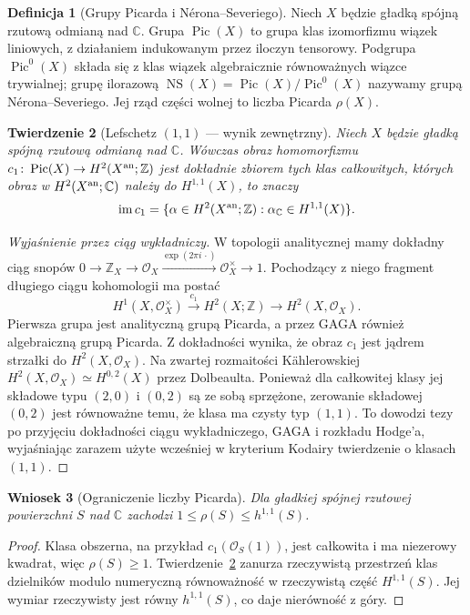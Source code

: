 \documentclass[11pt,a4paper,openany]{report}
\numberwithin{equation}{section}
\theoremstyle{plain}
\newtheorem{twierdzenie}{Twierdzenie}[section]
\newtheorem{wniosek}[twierdzenie]{Wniosek}
\theoremstyle{definition}
\newtheorem{definicja}[twierdzenie]{Definicja}
\theoremstyle{remark}
\newcommand{\Z}{\mathbb Z}
\newcommand{\C}{\mathbb C}
\begin{document}
\begin{definicja}[Grupy Picarda i Nérona--Severiego]
Niech $X$ będzie gładką spójną rzutową odmianą nad $\C$.
Grupa $\operatorname{Pic}(X)$ to grupa klas izomorfizmu
wiązek liniowych, z działaniem indukowanym przez iloczyn tensorowy.
Podgrupa $\operatorname{Pic}^0(X)$ składa się z klas
wiązek algebraicznie równoważnych wiązce trywialnej;
grupę ilorazową
$\operatorname{NS}(X)=\operatorname{Pic}(X)/\operatorname{Pic}^0(X)$
nazywamy grupą Nérona--Severiego.
Jej rząd części wolnej to liczba Picarda $\rho(X)$.
\end{definicja}

\begin{twierdzenie}[Lefschetz $(1,1)$ — wynik zewnętrzny]
\label{tw:ga10-11}
Niech $X$ będzie gładką spójną rzutową odmianą nad $\C$.
Wówczas obraz homomorfizmu
$c_1\colon\operatorname{Pic}(X)\to H^2(X^{\rm an};\Z)$
jest dokładnie zbiorem tych klas całkowitych,
których obraz w $H^2(X^{\rm an};\C)$ należy do
$H^{1,1}(X)$, to znaczy
\[
 \operatorname{im}c_1
 =\{\alpha\in H^2(X^{\rm an};\Z):
 \alpha_{\C}\in H^{1,1}(X)\}.
\]
\end{twierdzenie}

\begin{proof}[Wyjaśnienie przez ciąg wykładniczy]
W topologii analitycznej mamy dokładny ciąg snopów
$0\to\Z_X\to\mathcal O_X\xrightarrow{\exp(2\pi i\,\cdot)}
\mathcal O_X^{\times}\to1$.
Pochodzący z niego fragment długiego ciągu kohomologii
ma postać
\[
 H^1(X,\mathcal O_X^{\times})\xrightarrow{c_1}
 H^2(X;\Z)\longrightarrow H^2(X,\mathcal O_X).
\]
Pierwsza grupa jest analityczną grupą Picarda,
a przez GAGA również algebraiczną grupą Picarda.
Z dokładności wynika, że obraz $c_1$ jest jądrem
strzałki do $H^2(X,\mathcal O_X)$.
Na zwartej rozmaitości Kählerowskiej
$H^2(X,\mathcal O_X)\simeq H^{0,2}(X)$ przez Dolbeaulta.
Ponieważ dla całkowitej klasy jej składowe typu $(2,0)$
i $(0,2)$ są ze sobą sprzężone, zerowanie składowej
$(0,2)$ jest równoważne temu, że klasa ma czysty typ $(1,1)$.
To dowodzi tezy po przyjęciu dokładności ciągu wykładniczego,
GAGA i rozkładu Hodge'a, wyjaśniając zarazem użyte wcześniej
w kryterium Kodairy twierdzenie o klasach $(1,1)$.
\end{proof}

\begin{wniosek}[Ograniczenie liczby Picarda]
\label{wn:ga10-rho}
Dla gładkiej spójnej rzutowej powierzchni $S$ nad $\C$
zachodzi $1\le\rho(S)\le h^{1,1}(S)$.
\end{wniosek}
\begin{proof}
Klasa obszerna, na przykład $c_1(\mathcal O_S(1))$,
jest całkowita i ma niezerowy kwadrat, więc
$\rho(S)\ge1$.
Twierdzenie~\ref{tw:ga10-11} zanurza rzeczywistą
przestrzeń klas dzielników modulo numeryczną równoważność
w rzeczywistą część $H^{1,1}(S)$.
Jej wymiar rzeczywisty jest równy $h^{1,1}(S)$,
co daje nierówność z góry.
\end{proof}
\end{document}
